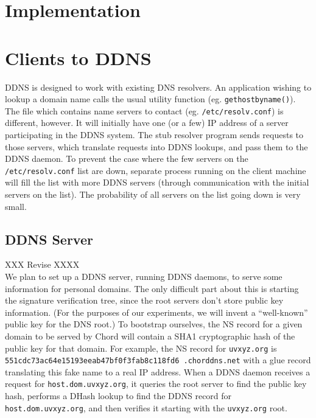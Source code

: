 \section{Implementation}

\section{Clients to DDNS}

DDNS is designed to work with existing DNS resolvers. 
An application wishing to lookup a domain name calls
the usual utility function (eg. {\tt gethostbyname()}). 
The file which contains name servers to contact 
(eg. {\tt /etc/resolv.conf}) is different, however.
It will initially have one (or a few) IP address of
a server participating in the DDNS system. The stub 
resolver program sends requests to those servers,
which translate requests into DDNS lookups,
and pass them to the DDNS daemon.
To prevent the case where the few servers on the 
{\tt /etc/resolv.conf} list are down, separate process 
running on the client machine will fill the list with
more DDNS servers (through communication with the initial
servers on the list). The probability of all servers
on the list going down is very small.

\subsection{DDNS Server}

XXX Revise XXXX\\
We plan to set up a DDNS server, running DDNS daemons,
to serve some information for personal domains.
The only difficult part about this is starting the signature
verification tree, since the root servers don't store public
key information. (For the purposes of our experiments,
we will invent a ``well-known'' public key for the DNS root.)
To bootstrap ourselves,
the NS record for a given domain to be served
by Chord will contain a SHA1 cryptographic hash of the
public key for that domain.
For example, the NS record for {\tt uvxyz.org}
is {\tt 551cdc73ac64e15193eeab47bf0f3fab8c118fd6
.chorddns.net}
with a glue record translating this fake name to a real IP address.
When a DDNS daemon receives a request for {\tt host.dom.uvxyz.org},
it queries the root server to find the public key hash,
performs a DHash lookup to find the DDNS record for {\tt host.dom.uvxyz.org},
and then verifies it starting with the {\tt uvxyz.org} root.

